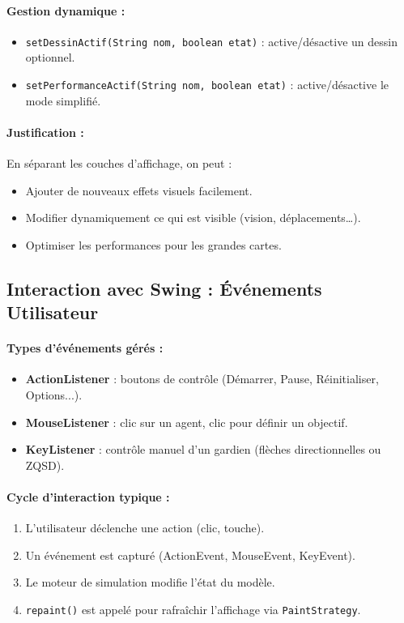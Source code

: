 \paragraph{Gestion dynamique :}
\begin{itemize}
    \item \texttt{setDessinActif(String nom, boolean etat)} : active/désactive un dessin optionnel.
    \item \texttt{setPerformanceActif(String nom, boolean etat)} : active/désactive le mode simplifié.
\end{itemize}

\paragraph{Justification :}
En séparant les couches d’affichage, on peut :
\begin{itemize}
    \item Ajouter de nouveaux effets visuels facilement.
    \item Modifier dynamiquement ce qui est visible (vision, déplacements…).
    \item Optimiser les performances pour les grandes cartes.
\end{itemize}

\bigskip

\subsection{Interaction avec Swing : Événements Utilisateur}

\paragraph{Types d’événements gérés :}
\begin{itemize}
    \item \textbf{ActionListener} : boutons de contrôle (Démarrer, Pause, Réinitialiser, Options...).
    \item \textbf{MouseListener} : clic sur un agent, clic pour définir un objectif.
    \item \textbf{KeyListener} : contrôle manuel d'un gardien (flèches directionnelles ou ZQSD).
\end{itemize}

\paragraph{Cycle d'interaction typique :}
\begin{enumerate}
    \item L'utilisateur déclenche une action (clic, touche).
    \item Un événement est capturé (ActionEvent, MouseEvent, KeyEvent).
    \item Le moteur de simulation modifie l'état du modèle.
    \item \texttt{repaint()} est appelé pour rafraîchir l’affichage via \texttt{PaintStrategy}.
\end{enumerate}

